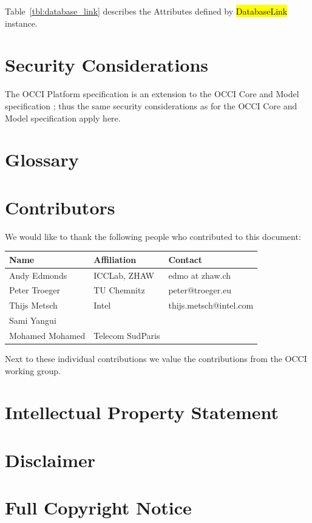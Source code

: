 \documentclass[10pt,a4paper]{article}
\begin{document}
Table~\ref{tbl:database_link} describes the Attributes defined by \hl{DatabaseLink} instance.


\section{Security Considerations}
The OCCI Platform specification is an extension to the OCCI Core
and Model specification \cite{occi:core}; thus the same security
considerations as for the OCCI Core and Model specification apply
here.

\section{Glossary}
\label{sec:glossary}


\section{Contributors}
We would like to thank the following people who contributed to this
document:

\begin{tabular}{l|p{2in}|p{2in}}
Name & Affiliation & Contact \\
\hline
Andy Edmonds & ICCLab, ZHAW & edmo at zhaw.ch \\
Peter Troeger & TU Chemnitz & peter@troeger.eu \\
Thijs Metsch & Intel & thijs.metsch@intel.com\\
Sami Yangui & & \\
Mohamed Mohamed & Telecom SudParis & \\
\end{tabular}

Next to these individual contributions we value the contributions from
the OCCI working group.

\section{Intellectual Property Statement}


\section{Disclaimer}


\section{Full Copyright Notice}




\end{document}
